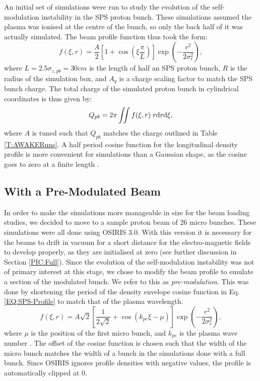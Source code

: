 An initial set of simulations were run to study the evolution of the self-modulation instability in the SPS proton bunch.
These simulations assumed the plasma was ionised at the centre of the bunch, so only the back half of it was actually simulated.
The beam profile function thus took the form:
\begin{equation}
    f(\xi,r) = \frac{A}{2} \left[1 + \cos\left(\xi\frac{\pi}{L}\right)\right] \exp\left(-\frac{r^{2}}{2\sigma_{r}^{2}}\right), \label{EQ:SPS-Profile}
\end{equation}
where $L = 2.5\sigma_{z,pb} = 30\unit{cm}$ is the length of half an SPS proton bunch, $R$ is the radius of the simulation box, and $A_{q}$ is a charge scaling factor to match the SPS bunch charge.
The total charge of the simulated proton bunch in cylindrical coordinates is thus given by:
\begin{equation}
    Q_{pb} = 2\pi \iint f(\xi,r) \;r \mathrm{d} r \mathrm{d} \xi, \label{EQ:SPS-Charge}
\end{equation}
where $A$ is tuned such that $Q_{pb}$ matches the charge outlined in Table \ref{T:AWAKERuns}.
A half period cosine function for the longitudinal density profile is more convenient for simulations than a Gaussian shape, as the cosine goes to zero at a finite length \cite{lotov:2010}.


\subsection{With a Pre-Modulated Beam}
\label{Sim:PBPreMod}

In order to make the simulations more manageable in size for the beam loading studies, we decided to move to a sample proton beam of $26$ micro bunches.
These simulations were all done using OSIRIS 3.0.
With this version it is necessary for the beams to drift in vacuum for a short distance for the electro-magnetic fields to develop properly, as they are initialised at zero (see further discussion in Section \ref{PIC:Full}).
Since the evolution of the self-modulation instability was not of primary interest at this stage, we chose to modify the beam profile to emulate a section of the modulated bunch.
We refer to this as \textit{pre-modulation}.
This was done by shortening the period of the density envelope cosine function in Eq. \ref{EQ:SPS-Profile} to match that of the plasma wavelength.
\begin{equation}
    f(\xi,r) = A\sqrt{2} \left[\frac{1}{2\sqrt{2}}
             + \cos\left(k_{pe}\xi - \mu\right)\right] \exp\left(-\frac{r^{2}}{2\sigma_{r}^{2}}\right), \label{EQ:PB-PreMod}
\end{equation}
where $\mu$ is the position of the first micro bunch, and $k_{pe}$ is the plasma wave number \cite{berglyd_olsen:2015}.
The offset of the cosine function is chosen such that the width of the micro bunch matches the width of a bunch in the simulations done with a full bunch.
Since OSIRIS ignores profile densities with negative values, the profile is automatically clipped at $0$.

